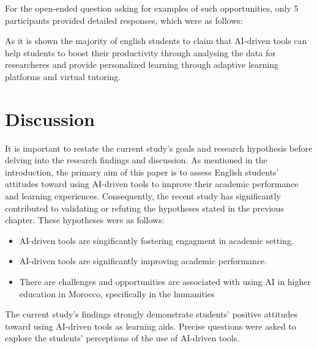 For the open-ended question asking for examples of such opportunities,
only 5 participants provided detailed responses, which were as follows:


As it is shown the majority of english students to claim that AI-driven tools can
help students to boost their productivity through analysing the data for researcheres
and provide personalized learning through adaptive learning platforms and virtual tutoring.

\section{Discussion}
It is important to restate the current study's goals and research 
hypothesis before delving into the research findings and discussion.
As mentioned in the introduction, the primary aim of this paper is 
to assess English students' attitudes toward using AI-driven tools
to improve their academic performance and learning experiences. 
Consequently, the recent study has significantly contributed to 
validating or refuting the hypotheses stated in the previous chapter. 
These hypotheses were as follows:
\begin{itemize}
	\item AI-driven tools are singificantly fostering engagment in academic setting.
	\item AI-driven tools are significantly improving academic performance.
	\item There are challenges and opportunities are associated with using AI in higher education
	      in Morocco, specifically in the humanities
\end{itemize}
The current study's findings strongly demonstrate students' positive 
attitudes toward using AI-driven tools as learning aids. 
Precise questions were asked to explore the students' perceptions of the use of AI-driven tools.

